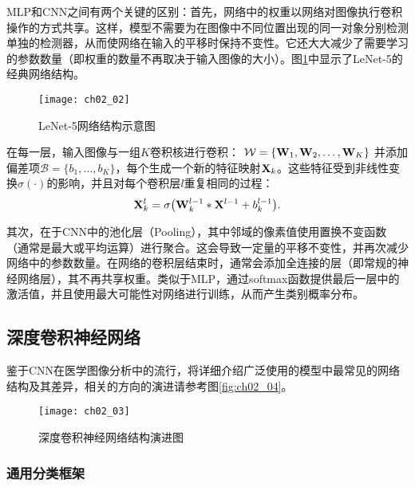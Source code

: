 MLP和CNN之间有两个关键的区别：首先，网络中的权重以网络对图像执行卷积操作的方式共享。这样，模型不需要为在图像中不同位置出现的同一对象分别检测单独的检测器，从而使网络在输入的平移时保持不变性。它还大大减少了需要学习的参数数量（即权重的数量不再取决于输入图像的大小）。图\ref{fig:ch02_02}中显示了LeNet-5\citep{Jarrett2009}的经典网络结构。
\begin{figure}[!htbp]
    \centering
    \texttt{[image: ch02\_02]}
    \caption{LeNet-5网络结构示意图}
    \label{fig:ch02_02}
\end{figure}
在每一层，输入图像与一组$K$卷积核进行卷积： $\mathcal{W} = \{ {\bf W}_{1}, {\bf W}_{2}, \ldots, {\bf W}_{K} \}$ 并添加偏差项$\mathcal{B} = \{b_{1}, \ldots, b_{K}\}$，每个生成一个新的特征映射${\bf X}_{k}$。这些特征受到非线性变换$\sigma(\cdot)$的影响，并且对每个卷积层$l$重复相同的过程：
\begin{equation}
\label{eq::mapping_cnn}
 {\bf X}_{k}^{l} = \sigma\big( {\bf W}_{k}^{l -1} \ast {\bf X}^{l -1} + b_{k}^{l-1} \big).
\end{equation}

其次，在于CNN中的池化层（Pooling），其中邻域的像素值使用置换不变函数（通常是最大或平均运算）进行聚合。这会导致一定量的平移不变性，并再次减少网络中的参数数量。在网络的卷积层结束时，通常会添加全连接的层（即常规的神经网络层），其不再共享权重。类似于MLP，通过softmax函数提供最后一层中的激活值，并且使用最大可能性对网络进行训练，从而产生类别概率分布。

\subsection{深度卷积神经网络}
鉴于CNN在医学图像分析中的流行，将详细介绍广泛使用的模型中最常见的网络结构及其差异，相关的方向的演进请参考图\ref{fig:ch02_04}。
\begin{figure}[!htbp]
    \centering
    \texttt{[image: ch02\_03]}
    \caption{深度卷积神经网络结构演进图}
    \label{fig:ch02_03}
\end{figure}
\subsubsection{通用分类框架}

